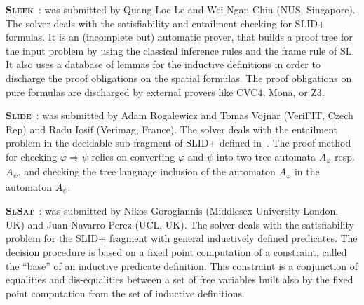 \documentclass[twoside,11pt]{article}
\newcommand{\limp}{\Rightarrow}
\newcommand{\SLRD}{\textsc{SLID}}
\newcommand{\SLEEK}{\textsc{Sleek}}
\newcommand{\SLIDE}{\textsc{Slide}}
\newcommand{\SLSAT}{\textsc{SlSat}}
\begin{document}
\medskip
\noindent
\textbf{\SLEEK}~\cite{ChinDNQ12,SLEEKsite}:
was submitted by 
Quang Loc Le and Wei Ngan Chin (NUS, Singapore).
The solver deals with the satisfiability and entailment checking for \SLRD+ formulas.
It is an (incomplete but) automatic prover, that builds a proof tree for the input problem by using the classical inference rules and the frame rule of SL. It also uses a database of lemmas for the inductive definitions in order to discharge the proof obligations on the spatial formulas.
%
The proof obligations on pure formulas are discharged by external provers like CVC4, Mona, or Z3.

\medskip
\noindent
\textbf{\SLIDE}~\cite{IosifRV14,SLIDEsite}: 
was submitted by 
Adam Rogalewicz and Tomas Vojnar (VeriFIT, Czech Rep) and
Radu Iosif (Verimag, France).
The solver deals with the entailment problem in the decidable sub-fragment of \SLRD+ defined in~\cite{IosifRS13}.
The proof method for checking $\varphi\limp\psi$ relies on converting $\varphi$ and $\psi$ into two tree automata $A_\varphi$ resp. $A_\psi$, and checking
the tree language inclusion of the automaton $A_\varphi$ in the automaton $A_\psi$.

\medskip
\noindent
\textbf{\SLSAT}~\cite{BrotherstonFPG14}:
was submitted by 
Nikos Gorogiannis (Middlesex University London, UK) 
and  Juan Navarro Perez (UCL, UK).
The solver deals with the satisfiability problem for the \SLRD+ fragment with general inductively defined predicates.
The decision procedure is based on a fixed point computation of a constraint, called the ``base'' of an inductive predicate definition. This constraint is a conjunction of equalities and dis-equalities between a set of free variables built also by the fixed point computation from the set of inductive definitions.
\end{document}

